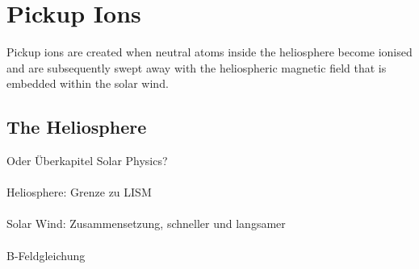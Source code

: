 
\chapter{Pickup Ions} %

\label{Chapter1} %





Pickup ions are created when neutral atoms inside the heliosphere become ionised and are subsequently swept away with the heliospheric magnetic field that is embedded within the solar wind.


\section{The Heliosphere}

Oder Überkapitel Solar Physics?
\\ \\
Heliosphere: Grenze zu LISM
\\ \\
Solar Wind: Zusammensetzung, schneller und langsamer \\ \\
B-Feldgleichung


